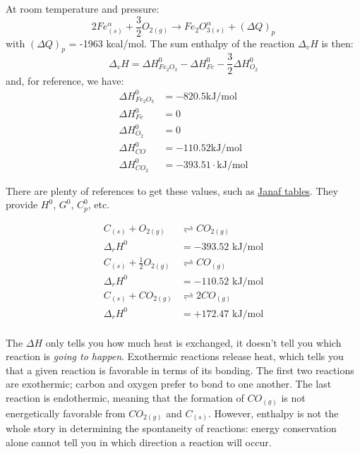\documentclass[12pt]{article}
\begin{document}
At room temperature and pressure:
\begin{equation}
2 Fe_{(s)}^{\alpha} + \frac{3}{2}O_{2 (g)} \rightarrow Fe_2O_{3 (s)}^{\alpha} + (\Delta Q)_p
\end{equation}
with $(\Delta Q)_p$ = -1963 kcal/mol.  The sum enthalpy of the reaction $\Delta_v H$ is then:
\begin{equation}
\Delta_v H = \Delta H^0_{Fe_2O_3} - \Delta H^0_{Fe} - \frac{3}{2} \Delta H^0_{O_2}
\end{equation}
and, for reference, we have:
\begin{align*}
\Delta H^0_{Fe_2O_3} &= -820.5 \text{kJ}/\text{mol}\\
\Delta H^0_{Fe} &= 0\\
\Delta H^0_{O_2} &= 0\\
\Delta H^0_{CO} &= -110.52 \text{kJ}/\text{mol}\\
\Delta H^0_{CO_2} &= -393.51 \cdot \text{kJ}/\text{mol}
\end{align*}

There are plenty of references to get these values, such as \href{http://kinetics.nist.gov/janaf/}{Janaf tables}. They provide $H^0$, $G^0$, $C_p^0$, etc.

\begin{align*}
C_{(s)} + O_{2 (g)} &\rightleftharpoons CO_{2 (g)}\\
\Delta_r H^0 &= -393.52 \text{ kJ}/\text{mol}\\
C_{(s)} + \frac{1}{2} O_{2 (g)} &\rightleftharpoons CO_{(g)}\\
\Delta_r H^0 &= -110.52 \text{ kJ}/\text{mol}\\
C_{(s)} + CO_{2 (g)} &\rightleftharpoons 2 CO_{(g)}\\
\Delta_r H^0 &= +172.47 \text{ kJ}/\text{mol}\\
\end{align*}

The $\Delta H$ only tells you how much heat is exchanged, it doesn't tell you which reaction is \emph{going to happen}. Exothermic reactions release heat, which tells you that a given reaction is favorable in terms of its bonding. The first two reactions are exothermic; carbon and oxygen prefer to bond to one another. The last reaction is endothermic, meaning that the formation of $CO_{(g)}$ is not energetically favorable from  $CO_{2 (g)}$ and $C_{(s)}$. However, enthalpy is not the whole story in determining the spontaneity of reactions: energy conservation alone cannot tell you in which direction a reaction will occur.
\end{document}
